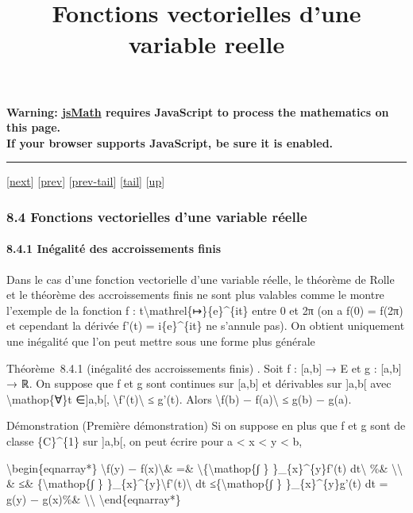 \documentclass[]{article}
\title{Fonctions vectorielles d'une variable reelle}
\author{}
\date{}
\begin{document}
\maketitle

\textbf{Warning: \href{http://www.math.union.edu/locate/jsMath}{jsMath}
requires JavaScript to process the mathematics on this page.\\ If your
browser supports JavaScript, be sure it is enabled.}

\begin{center}\rule{3in}{0.4pt}\end{center}

{[}\href{coursse48.html}{next}{]} {[}\href{coursse46.html}{prev}{]}
{[}\href{coursse46.html\#tailcoursse46.html}{prev-tail}{]}
{[}\hyperref[tailcoursse47.html]{tail}{]}
{[}\href{coursch9.html\#coursse47.html}{up}{]}

\subsubsection{8.4 Fonctions vectorielles d'une variable réelle}

\paragraph{8.4.1 Inégalité des accroissements finis}

Dans le cas d'une fonction vectorielle d'une variable réelle, le
théorème de Rolle et le théorème des accroissements finis ne sont plus
valables comme le montre l'exemple de la fonction f :
t\textbackslash{}mathrel\{↦\}\{e\}\^{}\{it\} entre 0 et 2π (on a f(0) =
f(2π) et cependant la dérivée f'(t) = i\{e\}\^{}\{it\} ne s'annule pas).
On obtient uniquement une inégalité que l'on peut mettre sous une forme
plus générale

Théorème~8.4.1 (inégalité des accroissements finis) . Soit f : {[}a,b{]}
→ E et g : {[}a,b{]} → ℝ. On suppose que f et g sont continues sur
{[}a,b{]} et dérivables sur {]}a,b{[} avec \textbackslash{}mathop\{∀\}t
∈{]}a,b{[}, \textbackslash{}\textbar{}f'(t)\textbackslash{}\textbar{} ≤
g'(t). Alors \textbackslash{}\textbar{}f(b) −
f(a)\textbackslash{}\textbar{} ≤ g(b) − g(a).

Démonstration (Première démonstration) Si on suppose en plus que f et g
sont de classe \{C\}\^{}\{1\} sur {]}a,b{[}, on peut écrire pour a
\textless{} x \textless{} y \textless{} b,

\textbackslash{}begin\{eqnarray*\} \textbackslash{}\textbar{}f(y) −
f(x)\textbackslash{}\textbar{}\& =\&
\textbackslash{}\textbar{}\{\textbackslash{}mathop\{∫ \}
\}\_\{x\}\^{}\{y\}f'(t) dt\textbackslash{}\textbar{} \%\&
\textbackslash{}\textbackslash{} \& ≤\& \{\textbackslash{}mathop\{∫ \}
\}\_\{x\}\^{}\{y\}\textbackslash{}\textbar{}f'(t)\textbackslash{}\textbar{}
dt ≤\{\textbackslash{}mathop\{∫ \} \}\_\{x\}\^{}\{y\}g'(t) dt = g(y) −
g(x)\%\& \textbackslash{}\textbackslash{}
\textbackslash{}end\{eqnarray*\}
\end{document}
